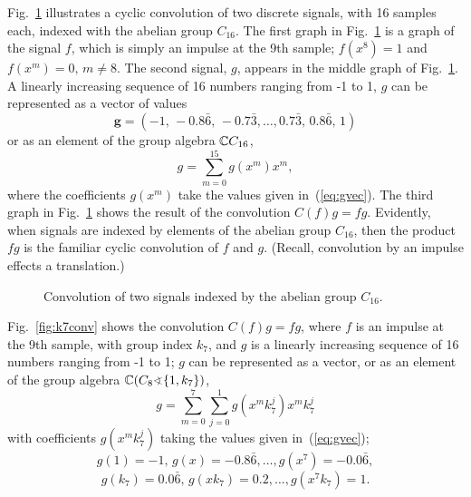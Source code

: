 Fig.~\ref{fig:C16conv} illustrates a cyclic
convolution of two discrete signals, with 16 samples each, 
indexed with the abelian group $C_{16}$. 
The first graph in Fig.~\ref{fig:C16conv} is a graph of the
signal $f$, which is simply an impulse at the 9th sample; \ie
$f(x^8) = 1$ and 
$f(x^m) = 0, \, m\neq 8$.
The second signal, $g$, appears in the middle graph of
Fig.~\ref{fig:C16conv}.  A linearly increasing sequence
of 16 numbers ranging from -1 to 1, $g$ can be represented
as a vector of values
\begin{equation}
  \label{eq:gvec}
\mathbf{g} = 
(-1, \, -0.8\bar{6}, \, -0.7\bar{3}, \ldots,
0.7\bar{3}, \, 0.8\bar{6}, \, 1)
\end{equation}
or as an element of the group algebra $\mathbb{C} C_{16}$,
\[
g = \sum_{m=0}^{15} g(x^m) x^m,
\]
where the coefficients $g(x^m)$ take the values given
in~(\ref{eq:gvec}).  The third graph in
Fig.~\ref{fig:C16conv} shows the result of the convolution
$C(f)g = fg$.    Evidently, when signals are indexed by
elements of the abelian group $C_{16}$, then the product $fg$
is the familiar cyclic convolution of $f$ and $g$. (Recall,
convolution by an impulse effects a translation.)

\begin{figure}
\centerline{}
\caption{Convolution of two signals indexed by the abelian
  group $C_{16}$.}
\label{fig:C16conv}
\end{figure}

Fig.~\ref{fig:k7conv} shows the convolution $C(f)g = fg$,
where $f$ is an impulse at the 9th sample, with group index $k_7$, and
$g$ is a linearly increasing sequence of 16 numbers ranging
from -1 to 1; $g$ can be represented as a vector,
or as an element of the group algebra $\C(C_8 \sdp \{1, k_7\})$,
\[
g = \sum_{m=0}^7 \sum_{j=0}^1 g(x^mk_7^j) x^mk_7^j
\]
with coefficients $g(x^mk_7^j)$ taking the values given
in~(\ref{eq:gvec}); \ie 
\[
g(1)=-1, \, g(x)=-0.8\bar{6}, %
\ldots, g(x^7)=-0.0\bar{6},
\]
\[
g(k_7)=0.0\bar{6}, \, g(x k_7)=0.2, \ldots, g(x^7 k_7) = 1.
\]

